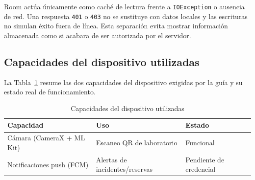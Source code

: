 Room actúa únicamente como caché de lectura frente a
\texttt{IOException} o ausencia de red. Una respuesta \texttt{401} o
\texttt{403} no se sustituye con datos locales y las escrituras no simulan
éxito fuera de línea. Esta separación evita mostrar información almacenada
como si acabara de ser autorizada por el servidor.

\subsection{Capacidades del dispositivo utilizadas}

La Tabla~\ref{tab:capacidades-movil} resume las dos capacidades del
dispositivo exigidas por la guía y su estado real de funcionamiento.

\begin{table}[htbp]
\centering
\caption{Capacidades del dispositivo utilizadas}
\label{tab:capacidades-movil}
\begin{tabular}{lll}
\toprule
Capacidad & Uso & Estado \\
\midrule
Cámara (CameraX + ML Kit) & Escaneo QR de laboratorio & Funcional \\
Notificaciones push (FCM) & Alertas de incidentes/reservas & Pendiente de credencial \\
\bottomrule
\end{tabular}
\end{table}

